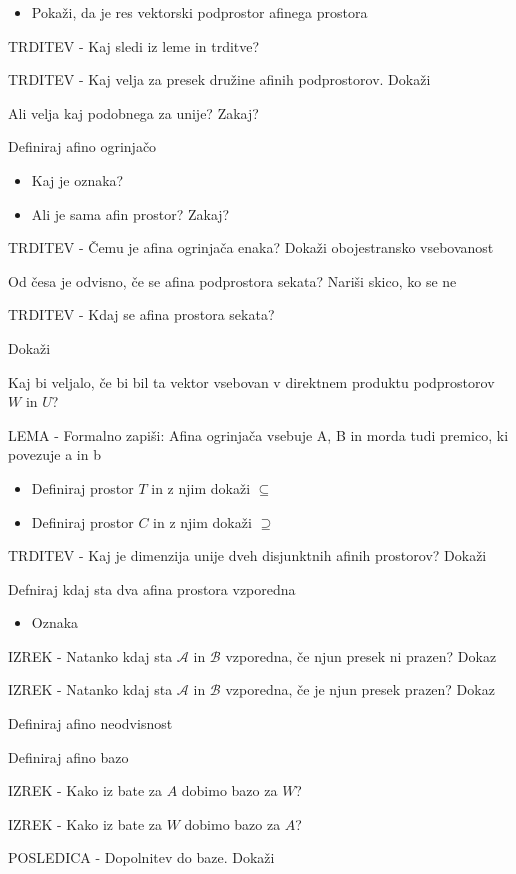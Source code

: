 \documentclass{article}
\begin{document}
\begin{enumerate}
\begin{itemize}
            \item Pokaži, da je res vektorski podprostor afinega prostora
        \end{itemize}
        \item TRDITEV - Kaj sledi iz leme in trditve?
        \item TRDITEV - Kaj velja za presek družine afinih podprostorov. Dokaži
        \item Ali velja kaj podobnega za unije? Zakaj?
        \item Definiraj afino ogrinjačo
        \begin{itemize}
            \item Kaj je oznaka?
            \item Ali je sama afin prostor? Zakaj?
        \end{itemize}
        \item TRDITEV - Čemu je afina ogrinjača enaka? Dokaži obojestransko vsebovanost
        \item Od česa je odvisno, če se afina podprostora sekata? Nariši skico, ko se ne
        {\color{blue}\item TRDITEV - Kdaj se afina prostora sekata?} Dokaži
        \item Kaj bi veljalo, če bi bil ta vektor vsebovan v direktnem produktu podprostorov $W$ in $U$?
        {\color{red}\item LEMA - Formalno zapiši: Afina ogrinjača vsebuje A, B in morda tudi premico, ki povezuje a in b}
        {\color{red}\begin{itemize}
            \item Definiraj prostor $T$ in z njim dokaži $\subseteq$
            \item Definiraj prostor $C$ in z njim dokaži $\supseteq$ 
        \end{itemize}}
        {\color{blue}\item TRDITEV - Kaj je dimenzija unije dveh disjunktnih afinih prostorov? Dokaži}
        \item Defniraj kdaj sta dva afina prostora vzporedna
        \begin{itemize}
            \item Oznaka
        \end{itemize}
        {\color{red}\item IZREK - Natanko kdaj sta $\mathcal{A}$ in $\mathcal{B}$ vzporedna, če njun presek ni prazen? Dokaz}
        {\color{red}\item IZREK - Natanko kdaj sta $\mathcal{A}$ in $\mathcal{B}$ vzporedna, če je njun presek prazen? Dokaz}
        \item Definiraj afino neodvisnost
        \item Definiraj afino bazo
        \item IZREK - Kako iz bate za $A$ dobimo bazo za $W$?
        \item IZREK - Kako iz bate za $W$ dobimo bazo za $A$?
        \item POSLEDICA - Dopolnitev do baze. Dokaži
    \end{enumerate}
\end{document}
